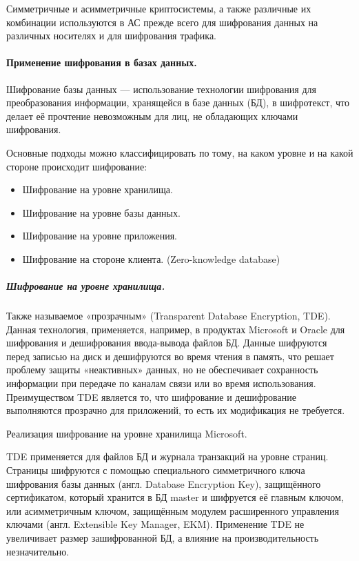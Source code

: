 Симметричные и асимметричные криптосистемы, а также различные их комбинации используются в АС
прежде всего для шифрования данных на различных носителях и для шифрования трафика.


\paragraph{Применение шифрования в базах данных.}

Шифрование базы данных — использование технологии шифрования для преобразования информации,
хранящейся в базе данных (БД), в шифротекст, что делает её прочтение невозможным для лиц, не
обладающих ключами шифрования.

Основные подходы можно классифицировать по тому, на каком уровне и на какой стороне происходит шифрование:
\begin{itemize}
    \item Шифрование на уровне хранилища.
    \item Шифрование на уровне базы данных.
    \item Шифрование на уровне приложения.
    \item Шифрование на стороне клиента. (Zero-knowledge database)
\end{itemize}

\subparagraph{Шифрование на уровне хранилища.}
Также называемое «прозрачным» (Transparent Database Encryption, TDE). Данная технология,
применяется, например, в продуктах Microsoft и Oracle для шифрования и дешифрования ввода-вывода
файлов БД. Данные шифруются перед записью на диск и дешифруются во время чтения в память, что
решает проблему защиты «неактивных» данных, но не обеспечивает сохранность информации при передаче
по каналам связи или во время использования. Преимуществом TDE является то, что шифрование и
дешифрование выполняются прозрачно для приложений, то есть их модификация не требуется.

Реализация шифрование на уровне хранилища Microsoft.

TDE применяется для файлов БД и журнала транзакций на уровне страниц. Страницы шифруются с помощью
специального симметричного ключа шифрования базы данных (англ. Database Encryption Key),
защищённого сертификатом, который хранится в БД master и шифруется её главным ключом, или
асимметричным ключом, защищённым модулем расширенного управления ключами (англ. Extensible Key
Manager, EKM). Применение TDE не увеличивает размер зашифрованной БД, а влияние на
производительность незначительно.

